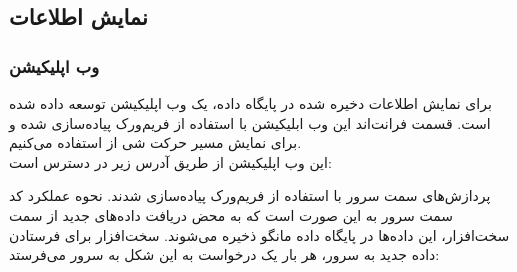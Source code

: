 \subsection{نمایش اطلاعات}
\subsubsection{وب اپلیکیشن}
برای نمایش اطلاعات دخیره شده در پایگاه داده، یک وب اپلیکیشن توسعه داده شده است. قسمت فرانت‌اند این وب ابلیکیشن با استفاده از فریم‌ورک  پیاده‌سازی شده و برای نمایش مسیر حرکت شی از  استفاده می‌کنیم. \\این وب اپلیکیشن از طریق آدرس زیر در دسترس است: \href{http://103.216.62.79}{}


پردازش‌های سمت سرور با استفاده از فریم‌ورک  پیاده‌سازی شدند. نحوه عملکرد کد سمت سرور به این صورت است که به محض دریافت داده‌های جدید از سمت سخت‌افزار، این داده‌ها در پایگاه داده مانگو ذخیره می‌شوند. سخت‌افزار برای فرستادن داده جدید به سرور، هر بار یک درخواست  به این شکل به سرور می‌فرستد: 


